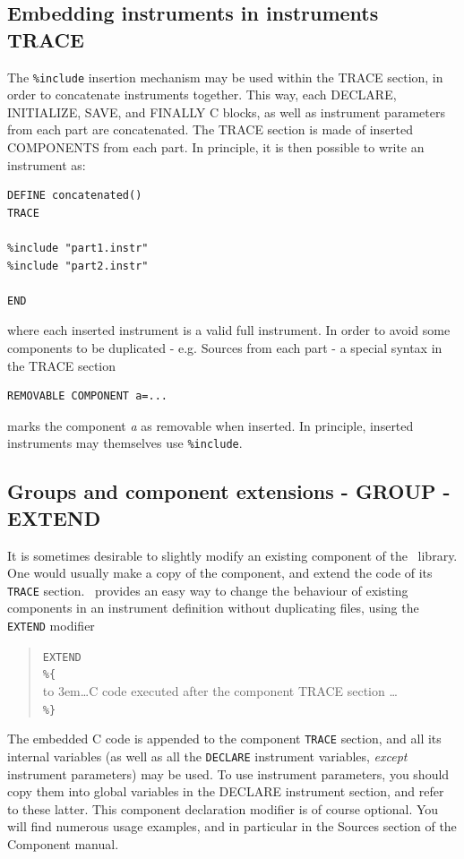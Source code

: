 \subsection{Embedding instruments in instruments TRACE}
\label{s:instrdefs-include-instr}
The \texttt{\%include} insertion mechanism may be used within the TRACE section,
in order to concatenate instruments together. This way, each DECLARE,
INITIALIZE, SAVE, and FINALLY C blocks, as well as instrument parameters from
each part are concatenated. The TRACE section is made of inserted COMPONENTS
from each part. In principle, it is then possible to write an instrument as:
\begin{verbatim}
DEFINE concatenated()
TRACE

%include "part1.instr"
%include "part2.instr"

END
\end{verbatim}
where each inserted instrument is a valid full instrument. In order to avoid
some components to be duplicated - e.g. Sources from each part - a special
syntax in the TRACE section
\begin{verbatim}
REMOVABLE COMPONENT a=...
\end{verbatim}
marks the component {\it a} as removable when inserted. In principle, inserted
instruments may themselves use \texttt{\%include}.

\subsection{Groups and component extensions - GROUP - EXTEND}
\label{s:instrdefs-extend-group}

It is sometimes desirable to slightly modify an existing component of the \MCS\ library. One would usually make a copy of the component, and extend the code of its \texttt{TRACE} section. \MCS\ provides an easy way to change the behaviour of existing components in an instrument definition without duplicating files, using the \texttt{EXTEND} modifier 
\begin{quote}
  \texttt{EXTEND} \\
  \verb|%{| \\
  \hbox to 3em{}\ldots C code executed after the component TRACE section \ldots \\
  \verb|%}|
\end{quote}  The embedded C code is appended to the
component \texttt{TRACE} section, and all its internal variables (as well as all
the \texttt{DECLARE} instrument variables, \emph{except} instrument parameters)
may be used. To use instrument parameters, you should copy them into global
variables in the DECLARE instrument section, and refer to these latter.  This
component declaration modifier is of course optional. You will find numerous
usage examples, and in particular in the Sources section of the Component
manual.

